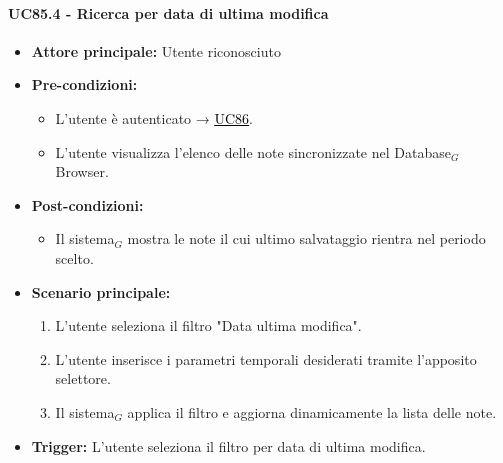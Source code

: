 \documentclass[a4paper, 10pt]{article}
\newcommand{\uclink}[2]{\hyperlink{#1}{\textcolor{black}{\underline{#2}}}}
\begin{document}
\paragraph{UC85.4 - Ricerca per data di ultima modifica}
\hypertarget{uc:85.4}{}
\begin{itemize}
    \item \textbf{Attore principale:} Utente riconosciuto
    \item \textbf{Pre-condizioni:} 
        \begin{itemize}
            \item L'utente è autenticato → \uclink{uc:86}{UC86}.
            \item L'utente visualizza l'elenco delle note sincronizzate nel Database$_G$ Browser.
        \end{itemize}
    \item \textbf{Post-condizioni:} 
        \begin{itemize}
            \item Il sistema$_G$ mostra le note il cui ultimo salvataggio rientra nel periodo scelto.
        \end{itemize}
    \item \textbf{Scenario principale:}
        \begin{enumerate}
            \item L'utente seleziona il filtro "Data ultima modifica".
            \item L'utente inserisce i parametri temporali desiderati tramite l'apposito selettore.
            \item Il sistema$_G$ applica il filtro e aggiorna dinamicamente la lista delle note.
        \end{enumerate}
    \item \textbf{Trigger:} L'utente seleziona il filtro per data di ultima modifica.
\end{itemize}
\end{document}
